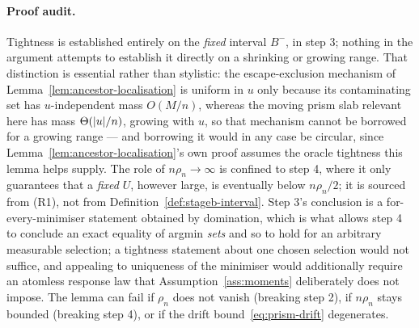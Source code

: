 \documentclass[11pt]{article}
\theoremstyle{plain}
\theoremstyle{definition}
\theoremstyle{remark}
\DeclarePairedDelimiter{\abs}{\lvert}{\rvert}
\begin{document}
\paragraph{Proof audit.}
Tightness is established entirely on the \emph{fixed} interval \(B^-\), in
step 3; nothing in the argument attempts to establish it directly on a
shrinking or growing range. That distinction is essential rather than
stylistic: the escape-exclusion mechanism of
Lemma~\ref{lem:ancestor-localisation} is uniform in \(u\) only because its
contaminating set has \(u\)-independent mass \(O(M/n)\), whereas the moving
prism slab relevant here has mass \(\Theta(\abs u/n)\), growing with \(u\), so
that mechanism cannot be borrowed for a growing range --- and borrowing it
would in any case be circular, since Lemma~\ref{lem:ancestor-localisation}'s
own proof assumes the oracle tightness this lemma helps supply. The role of
\(n\rho_n\to\infty\) is confined to step 4, where it only guarantees that a
\emph{fixed} \(U\), however large, is eventually below \(n\rho_n/2\); it is
sourced from (R1), not from Definition~\ref{def:stageb-interval}. Step 3's
conclusion is a for-every-minimiser statement obtained by domination, which is
what allows step 4 to conclude an exact equality of argmin \emph{sets} and so
to hold for an arbitrary measurable selection; a tightness statement about one
chosen selection would not suffice, and appealing to uniqueness of the
minimiser would additionally require an atomless response law that
Assumption~\ref{ass:moments} deliberately does not impose. The lemma can fail
if \(\rho_n\) does not vanish (breaking step 2), if \(n\rho_n\) stays bounded
(breaking step 4), or if the drift bound~\eqref{eq:prism-drift} degenerates.
\end{document}
